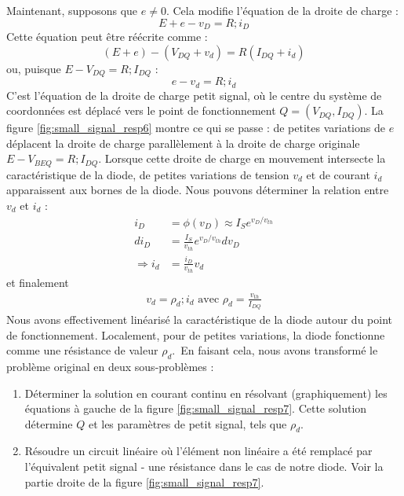 Maintenant, supposons que $e\neq 0$. Cela modifie l'équation de la droite de charge :
\begin{equation}
	E+e - v_D = R;i_D
\end{equation}
Cette équation peut être réécrite comme :
$$
(E+e) - (V_{DQ} + v_d) = R (I_{DQ} + i_d)
$$
ou, puisque $E - V_{DQ} = R;I_{DQ}$ :
\begin{equation}
	e - v_d = R;i_d
\end{equation}
C'est l'équation de la droite de charge petit signal, où le centre du système de coordonnées est déplacé vers le point de fonctionnement $Q = (V_{DQ}, I_{DQ})$. La figure \ref{fig:small_signal_resp6} montre ce qui se passe : de petites variations de $e$ déplacent la droite de charge parallèlement à la droite de charge originale $E - V_{BEQ} = R;I_{DQ}$. Lorsque cette droite de charge en mouvement intersecte la caractéristique de la diode, de petites variations de tension $v_d$ et de courant $i_d$ apparaissent aux bornes de la diode. Nous pouvons déterminer la relation entre $v_d$ et $i_d$ :
\begin{equation}
	\begin{split}
		i_D &= \phi(v_D) \approx I_S e^{v_D/v_{th}}\\
		di_D &= \frac{I_S}{v_{th}} e^{v_D/v_{th}} dv_D \\
		\Rightarrow i_d &= \frac{i_D}{v_{th}} v_d
	\end{split}
\end{equation}
et finalement
\begin{equation}
	\begin{split}
		v_d = \rho_d;i_d \text{ avec } \rho_d = \frac{v_{th}}{I_{DQ}}
	\end{split}
\end{equation}
Nous avons effectivement linéarisé la caractéristique de la diode autour du point de fonctionnement. Localement, pour de petites variations, la diode fonctionne comme une résistance de valeur $\rho_d$.\
En faisant cela, nous avons transformé le problème original en deux sous-problèmes :
\begin{enumerate}
	\item Déterminer la solution en courant continu en résolvant (graphiquement) les équations à gauche de la figure \ref{fig:small_signal_resp7}. Cette solution détermine $Q$ et les paramètres de petit signal, tels que $\rho_d$.
	\item Résoudre un circuit linéaire où l'élément non linéaire a été remplacé par l'équivalent petit signal - une résistance dans le cas de notre diode. Voir la partie droite de la figure \ref{fig:small_signal_resp7}.
\end{enumerate}
